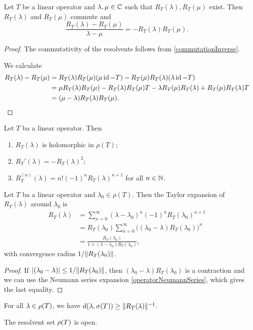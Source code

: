 \begin{proposition}
Let $T$ be a linear operator and $\lambda,\mu\in\mathbb{C}$ such that $R_T(\lambda), R_T(\mu)$ exist. Then $R_T(\lambda)$ and $R_T(\mu)$ commute and
\[ \frac{R_T(\lambda) - R_T(\mu)}{\lambda-\mu} = -R_T(\lambda)R_T(\mu). \]
\end{proposition}
\begin{proof}
The commutativity of the resolvents follows from \ref{commutationInverse}.

We calculate
\begin{align*}
R_T(\lambda) - R_T(\mu) &= R_T(\lambda)R_T(\mu)(\mu\operatorname{id} - T) - R_T(\mu)R_T(\lambda)(\lambda\operatorname{id} - T) \\
&= \mu R_T(\lambda)R_T(\mu) - R_T(\lambda)R_T(\mu) T - \lambda R_T(\mu)R_T(\lambda) + R_T(\mu)R_T(\lambda) T \\
&= (\mu - \lambda)R_T(\lambda)R_T(\mu).
\end{align*}
\end{proof}
\begin{corollary}
Let $T$ ba a linear operator. Then
\begin{enumerate}
\item $R_T(\lambda)$ is holomorphic in $\rho(T)$;
\item $R_T'(\lambda) = -R_T(\lambda)^2$;
\item $R_T^{(n)}(\lambda) = n!(-1)^n R_T(\lambda)^{n+1}$ for all $n\in \mathbb{N}$.
\end{enumerate}
\end{corollary}
\begin{corollary} \label{firstNeumannSeries}
Let $T$ ba a linear operator and $\lambda_0\in \rho(T)$. Then the Taylor expansion of $R_T(\lambda)$ around $\lambda_0$ is
\begin{align*}
R_T(\lambda) &= \sum_{n=0}^\infty (\lambda-\lambda_0)^n(-1)^nR_T(\lambda_0)^{n+1} \\
&= R_T(\lambda_0) \sum_{n=0}^\infty \Big((\lambda_0-\lambda)R_T(\lambda_0)\Big)^n \\
&= \frac{R_T(\lambda_0)}{1+(\lambda-\lambda_0)R_T(\lambda_0)},
\end{align*}
with convergence radius $1/\lVert R_T(\lambda_0)\rVert$.
\end{corollary}
\begin{proof}
If $|(\lambda_0-\lambda)| \leq 1/\lVert R_T(\lambda_0)\rVert$, then $(\lambda_0-\lambda)R_T(\lambda_0)$ is a contraction and we can use the Neumann series expansion \ref{operatorNeumannSeries}, which gives the last equality.
\end{proof}
\begin{corollary} \label{resolventNormDistanceToSpectrum}
For all $\lambda\in\rho(T)$, we have $d(\lambda, \sigma(T)) \geq \lVert R_T(\lambda)\rVert^{-1}$.
\end{corollary}
\begin{corollary}
The resolvent set $\rho(T)$ is open.
\end{corollary}


